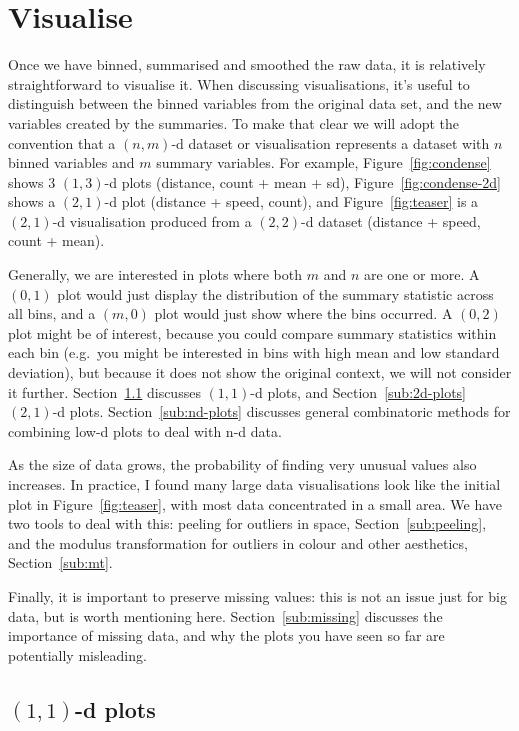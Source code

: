 \documentclass[journal]{vgtc}                %
\begin{document}
\section{Visualise}
\label{sec:visualise}

Once we have binned, summarised and smoothed the raw data, it is relatively straightforward to visualise it. When discussing visualisations, it's useful to distinguish between the binned variables from the original data set, and the new variables created by the summaries. To make that clear we will adopt the convention that a $(n, m)$-d dataset or visualisation represents a dataset with $n$ binned variables and $m$ summary variables. For example, Figure~\ref{fig:condense} shows 3 $(1, 3)$-d plots (distance, count + mean + sd), Figure~\ref{fig:condense-2d} shows a $(2, 1)$-d plot (distance + speed, count), and Figure~\ref{fig:teaser} is a $(2, 1)$-d visualisation produced from a $(2, 2)$-d dataset (distance + speed, count + mean).

Generally, we are interested in plots where both $m$ and $n$ are one or more. A $(0, 1)$ plot would just display the distribution of the summary statistic across all bins, and a $(m, 0)$ plot would just show where the bins occurred. A $(0, 2)$ plot might be of interest, because you could compare summary statistics within each bin (e.g.\ you might be interested in bins with high mean and low standard deviation), but because it does not show the original context, we will not consider it further. Section~\ref{sub:1d-plots} discusses $(1, 1)$-d plots, and Section~\ref{sub:2d-plots} $(2, 1)$-d plots. Section~\ref{sub:nd-plots} discusses general combinatoric methods for combining low-d plots to deal with n-d data.

As the size of data grows, the probability of finding very unusual values also increases. In practice, I found many large data visualisations look like the initial plot in Figure~\ref{fig:teaser}, with most data concentrated in a small area. We have two tools to deal with this: peeling for outliers in space, Section~\ref{sub:peeling}, and the modulus transformation for outliers in colour and other aesthetics, Section~\ref{sub:mt}.

Finally, it is important to preserve missing values: this is not an issue just for big data, but is worth mentioning here. Section~\ref{sub:missing} discusses the importance of missing data, and why the plots you have seen so far are potentially misleading.

\subsection{\texorpdfstring{$(1,1)$}{(1, 1)}-d plots}
\label{sub:1d-plots}
\end{document}
